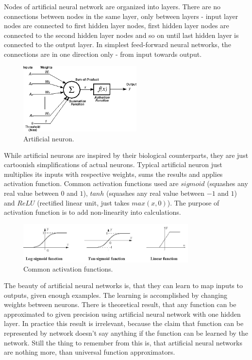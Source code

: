 \documentclass[a4paper,11pt]{article}
\begin{document}
Nodes of artificial neural network are organized into layers. There are no connections between nodes in the same layer, only between layers - input layer nodes are connected to first hidden layer nodes, first hidden layer nodes are connected to the second hidden layer nodes and so on until last hidden layer is connected to the output layer. In simplest feed-forward neural networks, the connections are in one direction only - from input towards output.

\begin{figure}[h]
	\centering
	\includegraphics[width=0.55\textwidth]{neuron.png}
	\caption{Artificial neuron.}
\end{figure}

While artificial neurons are inspired by their biological counterparts, they are just cartoonish simplifications of actual neurons. Typical artificial neuron just multiplies its inputs with respective weights, sums the results and applies activation function. Common activation functions used are $sigmoid$ (squashes any real value between $0$ and $1$), $tanh$ (squashes any real value between $-1$ and $1$) and $ReLU$ (rectified linear unit, just takes $max(x, 0)$). The purpose of activation function is to add non-linearity into calculations.

\begin{figure}[h]
	\centering
	\includegraphics[width=0.8\textwidth]{activation_functions.png}
	\caption{Common activation functions.}
\end{figure}

The beauty of artificial neural networks is, that they can learn to map inputs to outputs, given enough examples. The learning is accomplished by changing weights between neurons. There is theoretical result, that any function can be approximated to given precision using artificial neural network with one hidden layer. In practice this result is irrelevant, because the claim that function can be represented by network doesn't say anything if the function can be learned by the network. Still the thing to remember from this is, that artificial neural networks are nothing more, than universal function approximators.
\end{document}
